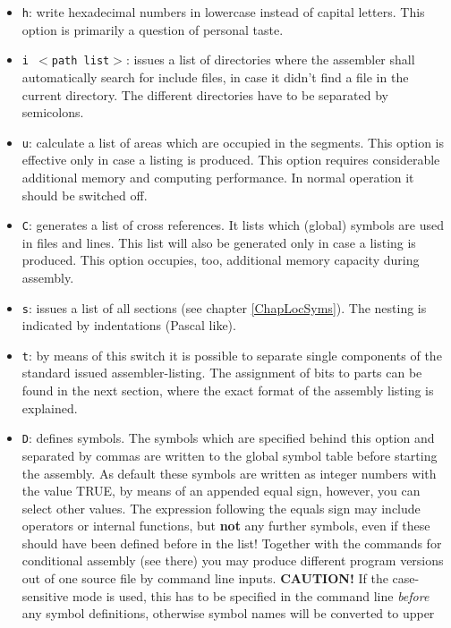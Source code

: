 \documentclass[12pt,twoside]{report}
\newcommand{\bb}[1]{{\bf #1}}
\newcommand{\tty}[1]{{\tt #1}}
\begin{document}
\begin{itemize}
\item{\tty{h}: write hexadecimal numbers in lowercase instead of capital
      letters. This option is primarily a question of personal
      taste.}
\item{\tty{i $<$path list$>$}: issues a list of directories where the
      assembler shall automatically search for include
      files, in case it didn't find a file in the
      current directory.  The different directories
      have to be separated by semicolons.}
\item{\tty{u}: calculate a list of areas which are occupied in the segments.
      This option is effective only in case a listing is
      produced. This option requires considerable additional
      memory and computing performance. In normal operation it
      should be switched off.}
\item{\tty{C}: generates a list of cross references.  It lists which (global)
      symbols are used in files and lines.  This list will also be
      generated only in case a listing is produced.  This option
      occupies, too, additional memory capacity during assembly.}
\item{\tty{s}: issues a list of all sections (see chapter
      \ref{ChapLocSyms}).  The nesting is indicated  by indentations
      (Pascal like).}
\item{\tty{t}: by means of this switch it is possible to separate single
      components of the standard issued assembler-listing.  The assignment
      of bits to parts can be found in the next section, where the exact
      format of the assembly listing is explained.}
\item{\tty{D}: defines symbols.  The symbols which are specified behind this
      option and separated by commas are written to the
      global symbol table before starting the assembly.  As default
      these symbols are written as integer numbers with the
      value TRUE, by means of an appended equal sign, however, you
      can select other values.  The expression following the equals
      sign may include operators or internal functions, but \bb{not}
      any further symbols, even if these should have been defined
      before in the list!  Together with the commands for
      conditional assembly (see there) you may produce different
      program versions out of one source file by command line
      inputs. {\bf CAUTION!} If the case-sensitive mode is used, this has
      to be specified in the command line {\em before} any symbol
      definitions, otherwise symbol names will be converted to upper
}
\end{itemize}
\end{document}
